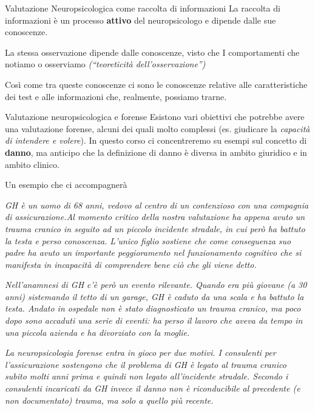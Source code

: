\documentclass[
  ignorenonframetext,
]{beamer}
\begin{document}
\begin{frame}{Valutazione Neuropsicologica come raccolta di
informazioni}
\label{valutazione-neuropsicologica-come-raccolta-di-informazioni-1}
La raccolta di informazioni è un processo \textbf{attivo} del
neuropsicologo e dipende dalle sue conoscenze.

La stessa osservazione dipende dalle conoscenze, visto che I
comportamenti che notiamo o osserviamo \emph{(``teoreticità
dell'osservazione'')}

Così come tra queste conoscenze ci sono le conoscenze relative alle
caratteristiche dei test e alle informazioni che, realmente, possiamo
trarne.
\end{frame}

\begin{frame}{Valutazione neuropsicologica e forense}
\label{valutazione-neuropsicologica-e-forense}
Esistono vari obiettivi che potrebbe avere una valutazione forense,
alcuni dei quali molto complessi (es. giudicare la \emph{capacità di
intendere e volere}). In questo corso ci concentreremo su esempi sul
concetto di \textbf{danno}, ma anticipo che la definizione di danno è
diversa in ambito giuridico e in ambito clinico.
\end{frame}

\begin{frame}{Un esempio che ci accompagnerà}
\label{un-esempio-che-ci-accompagneruxe0}
\scriptsize

\emph{GH è un uomo di 68 anni, vedovo al centro di un contenzioso con
una compagnia di assicurazione.Al momento critico della nostra
valutazione ha appena avuto un trauma cranico in seguito ad un piccolo
incidente stradale, in cui però ha battuto la testa e perso conoscenza.
L'unico figlio sostiene che come conseguenza suo padre ha avuto un
importante peggioramento nel funzionamento cognitivo che si manifesta in
incapacità di comprendere bene ciò che gli viene detto.}

\emph{Nell'anamnesi di GH c'è però un evento rilevante. Quando era più
giovane (a 30 anni) sistemando il tetto di un garage, GH è caduto da una
scala e ha battuto la testa. Andato in ospedale non è stato
diagnosticato un trauma cranico, ma poco dopo sono accaduti una serie di
eventi: ha perso il lavoro che aveva da tempo in una piccola azienda e
ha divorziato con la moglie.}

\emph{La neuropsicologia forense entra in gioco per due motivi. I
consulenti per l'assicurazione sostengono che il problema di GH è legato
al trauma cranico subito molti anni prima e quindi non legato
all'incidente stradale. Secondo i consulenti incaricati da GH invece il
danno non è riconducibile al precedente (e non documentato) trauma, ma
solo a quello più recente.}
\end{frame}
\end{document}
